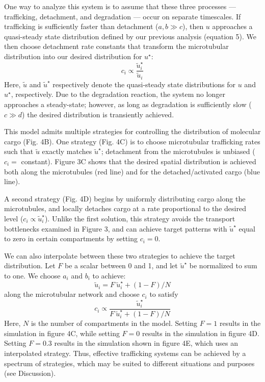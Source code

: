 \documentclass[fleqn,10pt]{wlpeerj}
\begin{document}
One way to analyze this system is to assume that these three processes --- trafficking, detachment, and degradation --- occur on separate timescales. If trafficking is sufficiently faster than detachment ($a,b \gg c$), then $u$ approaches a quasi-steady state distribution defined by our previous analysis (equation 5). We then choose detachment rate constants that transform the microtubular distribution into our desired distribution for $u^\star$:
$$
c_i \propto \frac{\tilde{u}^\star_i}{\tilde{u}_i}
$$
Here, $\tilde{u}$ and $\tilde{u}^\star$ respectively denote the quasi-steady state distributions for $u$ and $u^\star$, respectively. Due to the degradation reaction, the system no longer approaches a steady-state; however, as long as degradation is sufficiently slow ($c \gg d$) the desired distribution is transiently achieved.

This model admits multiple strategies for controlling the distribution of molecular cargo (Fig. 4B). One strategy (Fig. 4C) is to choose microtubular trafficking rates such that $\tilde{u}$ exactly matches $\tilde{u}^\star$; detachment from the microtubules is unbiased ($c_i =$ constant). Figure 3C shows that the desired spatial distribution is achieved both along the microtubules (red line) and for the detached/activated cargo (blue line).

A second strategy (Fig. 4D) begins by uniformly distributing cargo along the microtubules, and locally detaches cargo at a rate proportional to the desired level ($c_i \propto \tilde{u}^\star_i$). Unlike the first solution, this strategy avoids the transport bottlenecks examined in Figure 3, and can achieve target patterns with  $\tilde{u}^\star$ equal to zero in certain compartments by setting $c_i = 0$.

We can also interpolate between these two strategies to achieve the target distribution. Let $F$ be a scalar between 0 and 1, and let $\tilde{u}^\star$ be normalized to sum to one. We choose $a_i$ and $b_i$ to achieve:
$$
\tilde{u}_i = F~\tilde{u}_i^\star + (1-F)/N 
$$
along the microtubular network and choose $c_i$ to satisfy
$$
c_i \propto \frac{\tilde{u}_i^\star}{F~\tilde{u}_i^\star + (1-F)/N} 
$$
Here, $N$ is the number of compartments in the model. Setting $F=1$ results in the simulation in figure 4C, while setting $F=0$ results in the simulation in figure 4D. Setting $F=0.3$ results in the simulation shown in figure 4E, which uses an interpolated strategy. Thus, effective trafficking systems can be achieved by a spectrum of strategies, which may be suited to different situations and purposes (see Discussion).
\end{document}
